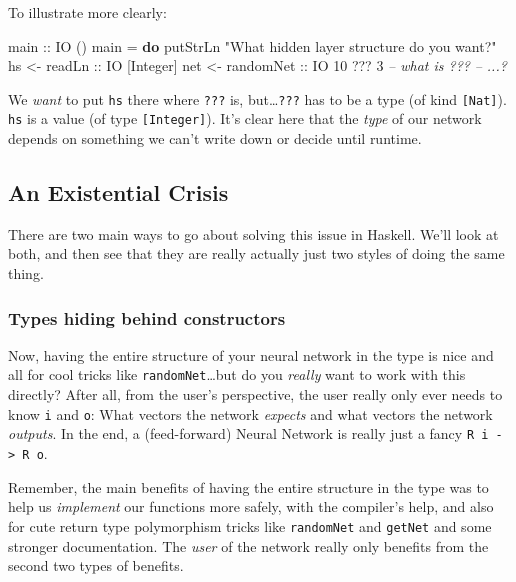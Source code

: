 \documentclass[]{article}
\newenvironment{Shaded}{}{}
\newcommand{\KeywordTok}[1]{\textcolor[rgb]{0.00,0.44,0.13}{\textbf{{#1}}}}
\newcommand{\DataTypeTok}[1]{\textcolor[rgb]{0.56,0.13,0.00}{{#1}}}
\newcommand{\DecValTok}[1]{\textcolor[rgb]{0.25,0.63,0.44}{{#1}}}
\newcommand{\StringTok}[1]{\textcolor[rgb]{0.25,0.44,0.63}{{#1}}}
\newcommand{\CommentTok}[1]{\textcolor[rgb]{0.38,0.63,0.69}{\textit{{#1}}}}
\newcommand{\OtherTok}[1]{\textcolor[rgb]{0.00,0.44,0.13}{{#1}}}
\newcommand{\FunctionTok}[1]{\textcolor[rgb]{0.02,0.16,0.49}{{#1}}}
\newcommand{\NormalTok}[1]{{#1}}
\begin{document}
To illustrate more clearly:

\begin{Shaded}
\begin{Highlighting}[]
\OtherTok{main ::} \DataTypeTok{IO} \NormalTok{()}
\NormalTok{main }\FunctionTok{=} \KeywordTok{do}
    \NormalTok{putStrLn }\StringTok{"What hidden layer structure do you want?"}
    \NormalTok{hs  }\OtherTok{<- readLn    ::} \DataTypeTok{IO} \NormalTok{[}\DataTypeTok{Integer}\NormalTok{]}
    \NormalTok{net }\OtherTok{<- randomNet ::} \DataTypeTok{IO} \DecValTok{10} \FunctionTok{???} \DecValTok{3}   \CommentTok{-- what is ???}
    \CommentTok{-- ...?}
\end{Highlighting}
\end{Shaded}

We \emph{want} to put \texttt{hs} there where \texttt{???} is,
but\ldots{}\texttt{???} has to be a type (of kind \texttt{{[}Nat{]}}).
\texttt{hs} is a value (of type \texttt{{[}Integer{]}}). It's clear here that
the \emph{type} of our network depends on something we can't write down or
decide until runtime.

\subsection{An Existential Crisis}\label{an-existential-crisis}

There are two main ways to go about solving this issue in Haskell. We'll look at
both, and then see that they are really actually just two styles of doing the
same thing.

\subsubsection{Types hiding behind
constructors}\label{types-hiding-behind-constructors}

Now, having the entire structure of your neural network in the type is nice and
all for cool tricks like \texttt{randomNet}\ldots{}but do you \emph{really} want
to work with this directly? After all, from the user's perspective, the user
really only ever needs to know \texttt{i} and \texttt{o}: What vectors the
network \emph{expects} and what vectors the network \emph{outputs}. In the end,
a (feed-forward) Neural Network is really just a fancy
\texttt{R\ i\ -\textgreater{}\ R\ o}.

Remember, the main benefits of having the entire structure in the type was to
help us \emph{implement} our functions more safely, with the compiler's help,
and also for cute return type polymorphism tricks like \texttt{randomNet} and
\texttt{getNet} and some stronger documentation. The \emph{user} of the network
really only benefits from the second two types of benefits.
\end{document}
